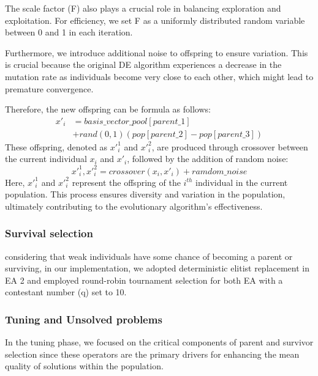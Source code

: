The scale factor (F) also plays a crucial role in balancing exploration and exploitation. For efficiency, we set F as a uniformly distributed random variable between 0 and 1 in each iteration.

Furthermore, we introduce additional noise to offspring to ensure variation. This is crucial because the original DE algorithm experiences a decrease in the mutation rate as individuals become very close to each other, which might lead to premature convergence. 

Therefore, the new offspring can be formula as follows:
\begin{equation}
\begin{aligned}
x'_i & =  basis\_vector\_pool[parent\_1] 
\\& + rand(0,1)(pop[parent\_2] - pop[parent\_3])
\end{aligned}
\end{equation}
These offspring, denoted as $x'_i^1$ and $x'_i^2$, are produced through crossover between the current individual $x_i$ and $x'_i$, followed by the addition of random noise:
\begin{equation}
x'_i^1,x'_i^2 = crossover(x_i,x'_i) + ramdom\_noise
\end{equation}
Here, $x'_i^1$ and $x'_i^2$ represent the offspring of the $i^{th}$ individual in the current population. 
This process ensures diversity and variation in the population, ultimately contributing to the evolutionary algorithm's effectiveness.

\subsubsection{Survival selection}
considering that weak individuals have some chance of becoming a parent or surviving, in our implementation, we adopted deterministic elitist replacement in EA 2 and employed round-robin tournament selection for both EA with a contestant number (q) set to 10.

\subsubsection{Tuning and Unsolved problems}
\label{sec:improve}
In the tuning phase, we focused on the critical components of parent and survivor selection since these operators are the primary drivers for enhancing the mean quality of solutions within the population.

